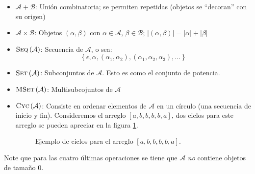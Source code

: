 \documentclass[english, spanish, fleqn, 10pt]{article}
\newcommand{\comillas}[1]{``#1''}
\numberwithin{equation}{section}
\newcommand{\nparentesis}[1]{\left( #1 \right)}
\newcommand{\llaves}[1]{\left \{ #1 \right \}}
\newcommand{\nabsoluto}[1]{\left| #1 \right|}
\newcommand{\ncorchetes}[1]{\left[ #1 \right]}
\theoremstyle{definition}
\DeclareMathOperator{\Seq}{\textsc{Seq}}
\DeclareMathOperator{\Cyc}{\textsc{Cyc}}
\DeclareMathOperator{\Set}{\textsc{Set}}
\DeclareMathOperator{\MSet}{\textsc{MSet}}
\begin{document}
\begin{itemize}
	\item $\mathcal{A} + \mathcal{B}$: Unión combinatoria; se permiten repetidas (objetos se \comillas{decoran} con su origen)
	
	\item $\mathcal{A} \times \mathcal{B}$: Objetos $\nparentesis{\alpha, \beta}$ con $\alpha \in \mathcal{A}$, $\beta \in \mathcal{B}$; $\nabsoluto{\nparentesis{\alpha, \beta}}=\nabsoluto{\alpha} + \nabsoluto{\beta}$
	
	\item $\Seq\nparentesis{\mathcal{A}}$: Secuencia de $\mathcal{A}$, o sea:
	\begin{equation*}
	\llaves{\epsilon, \alpha, \nparentesis{\alpha_1, \alpha_2}, \nparentesis{\alpha_1, \alpha_2, \alpha_3}, \ldots}
	\end{equation*}
	
	\item $\Set\nparentesis{\mathcal{A}}$: Subconjuntos de $\mathcal{A}$. Esto es como el conjunto de potencia.
	
	\item $\MSet\nparentesis{\mathcal{A}}$: Multisubcojuntos de $\mathcal{A}$
	
	\item $\Cyc\nparentesis{\mathcal{A}}$: Consiste en ordenar elementos de $\mathcal{A}$ en un círculo (una secuencia de inicio y fin). Consideremos el arreglo $\ncorchetes{a, b, b, b, b, a}$, dos ciclos para este arreglo se pueden apreciar en la figura \ref{19::EjemploCiclo}.
	\begin{figure}[!h]
		\centering
		\begin{subfigure}[!h]{0.3\textwidth}
			\centering
			\caption{}
		\end{subfigure}
		\begin{subfigure}[!h]{0.3\textwidth}
			\centering
			\caption{}
		\end{subfigure}
		\caption{Ejemplo de ciclos para el arreglo $\ncorchetes{a, b, b, b, b, a}$.}
		\label{19::EjemploCiclo}
	\end{figure}
\end{itemize}
Note que para las cuatro últimas operaciones se tiene que $\mathcal{A}$ \emph{no} contiene objetos de tamaño 0.
\end{document}
